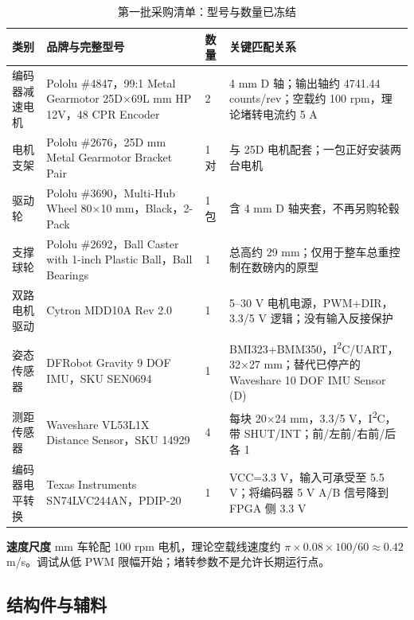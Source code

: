 \documentclass[UTF8,a4paper,zihao=-4,fontset=none]{ctexart}
\newcommand{\note}[2]{\par\smallskip\noindent\colorbox{Pale}{\parbox{\dimexpr\linewidth-2\fboxsep\relax}{\small\textbf{\color{Teal}#1}\quad #2}}\par\smallskip}
\begin{document}
\begin{table}[H]\footnotesize
\caption{第一批采购清单：型号与数量已冻结}
\begin{tabularx}{\linewidth}{@{}L{2.45cm}L{5.25cm}C{.75cm}Y@{}}\toprule
\textbf{类别} & \textbf{品牌与完整型号} & \textbf{数量} & \textbf{关键匹配关系}\\\midrule
编码器减速电机 & Pololu \#4847，99:1 Metal Gearmotor 25D$\times$69L mm HP 12V，48 CPR Encoder & 2 & 4 mm D 轴；输出轴约 4741.44 counts/rev；空载约 100 rpm，理论堵转电流约 5 A\cite{motor}\\
电机支架 & Pololu \#2676，25D mm Metal Gearmotor Bracket Pair & 1 对 & 与 25D 电机配套；一包正好安装两台电机\cite{bracket}\\
驱动轮 & Pololu \#3690，Multi-Hub Wheel 80$\times$10 mm，Black，2-Pack & 1 包 & 含 4 mm D 轴夹套，不再另购轮毂\cite{wheel}\\
支撑球轮 & Pololu \#2692，Ball Caster with 1-inch Plastic Ball，Ball Bearings & 1 & 总高约 29 mm；仅用于整车总重控制在数磅内的原型\cite{caster}\\
双路电机驱动 & Cytron MDD10A Rev 2.0 & 1 & 5--30 V 电机电源，PWM+DIR，3.3/5 V 逻辑；没有输入反接保护\cite{driver}\\
姿态传感器 & DFRobot Gravity 9 DOF IMU，SKU SEN0694 & 1 & BMI323+BMM350，I\textsuperscript{2}C/UART，32$\times$27 mm；替代已停产的 Waveshare 10 DOF IMU Sensor (D)\cite{imu}\\
测距传感器 & Waveshare VL53L1X Distance Sensor，SKU 14929 & 4 & 每块 20$\times$24 mm，3.3/5 V，I\textsuperscript{2}C，带 SHUT/INT；前/左前/右前/后各 1\cite{tof}\\
编码器电平转换 & Texas Instruments SN74LVC244AN，PDIP-20 & 1 & VCC=3.3 V，输入可承受至 5.5 V；将编码器 5 V A/B 信号降到 FPGA 侧 3.3 V\cite{level}\\\bottomrule
\end{tabularx}
\end{table}

\note{速度尺度}{80 mm 车轮配 100 rpm 电机，理论空载线速度约 $\pi\times0.08\times100/60\approx0.42$ m/s。调试从低 PWM 限幅开始；堵转参数不是允许长期运行点。}

\subsection{结构件与辅料}
\end{document}
